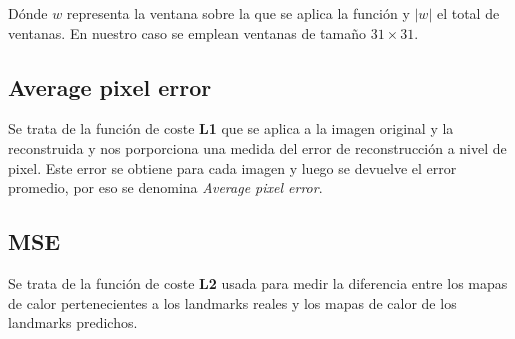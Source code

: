             \noindent Dónde $w$ representa la ventana sobre la que se aplica la función y $|w|$ el total de ventanas. En nuestro caso se emplean ventanas de tamaño $31\times 31$.

        \subsection{Average pixel error}
            \noindent Se trata de la función de coste \textbf{L1} que se aplica a la imagen original y la reconstruida  y nos porporciona una medida del error de reconstrucción a nivel de pixel. Este error se obtiene para cada imagen y luego se devuelve el error promedio, por eso se denomina \textit{Average pixel error}.

        \subsection{MSE}
            \noindent Se trata de la función de coste \textbf{L2} usada para medir la diferencia entre los mapas de calor pertenecientes a los landmarks reales y los mapas de calor de los landmarks predichos.


\endinput

